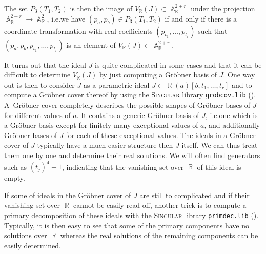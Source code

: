 \documentclass[noend]{amsproc}
\theoremstyle{definition}
\newcommand{\Singular}{\textsc{Singular}}
\DeclareMathOperator{\R}{\mathbb{R}}
\DeclareMathOperator{\A}{\mathbb{A}}
\begin{document}
The set $P_3(T_1, T_2)$ is then the image of $V_{\R}(J) \subset \A_{\R}^{2+r}$
under the projection $\A_{\R}^{2+r} \rightarrow \A_{\R}^2$, i.e.\@ we have
$(p_a, p_b) \in P_3(T_1, T_2)$ if and only if there is a coordinate
transformation with real coefficients $(p_{t_1}, \ldots, p_{t_r})$ such that
$(p_a, p_b, p_{t_1}, \ldots, p_{t_r})$ is an element of
$V_{\R}(J) \subset \A_{\R}^{2+r}$.

It turns out that the ideal $J$ is quite complicated in some cases and that it
can be difficult to determine $V_{\R}(J)$ by just computing a Gr\"obner basis
of $J$. One way out is then to consider $J$ as a parametric ideal
$J \subset \R(a)[b,t_1,\ldots,t_r]$ and to compute a Gr\"obner cover thereof
by using the \Singular{} library \verb+grobcov.lib+ (\cite{grobcov}).
A~Gr\"obner cover completely describes the possible shapes of Gr\"obner bases
of $J$ for different values of $a$. It contains a generic Gr\"obner basis of
$J$, i.e.\@ one which is a Gr\"obner basis except for finitely many exceptional
values of $a$, and additionally Gr\"obner bases of $J$ for each of these
exceptional values. The ideals in a Gr\"obner cover of $J$ typically have a
much easier structure then $J$ itself. We can thus treat them one by one and
determine their real solutions. We will often find generators such as
$(t_j)^4+1$, indicating that the vanishing set over $\R$ of this ideal is
empty.

If some of ideals in the Gr\"obner cover of $J$ are still to complicated and if
their vanishing set over $\R$ cannot be easily read off, another trick is to
compute a primary decomposition of these ideals with the \Singular{} library
\verb+primdec.lib+ (\cite{primdec}). Typically, it is then easy to see that
some of the primary components have no solutions over $\R$ whereas the real
solutions of the remaining components can be easily determined.
\end{document}
